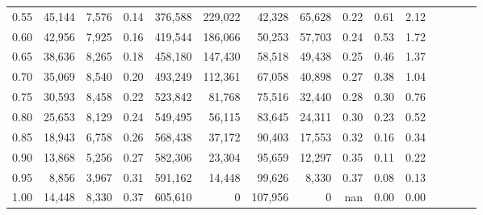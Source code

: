 \begin{tabular}{rrrcrrrrrrrrrrr}
0.55 &  45,144 &  7,576 &                                       0.14 &  376,588 &  229,022 &   42,328 &   65,628 &  0.22 &  0.61 &                         2.12 \\
0.60 &  42,956 &  7,925 &                                       0.16 &  419,544 &  186,066 &   50,253 &   57,703 &  0.24 &  0.53 &                         1.72 \\
0.65 &  38,636 &  8,265 &                                       0.18 &  458,180 &  147,430 &   58,518 &   49,438 &  0.25 &  0.46 &                         1.37 \\
0.70 &  35,069 &  8,540 &                                       0.20 &  493,249 &  112,361 &   67,058 &   40,898 &  0.27 &  0.38 &                         1.04 \\
0.75 &  30,593 &  8,458 &                                       0.22 &  523,842 &   81,768 &   75,516 &   32,440 &  0.28 &  0.30 &                         0.76 \\
0.80 &  25,653 &  8,129 &                                       0.24 &  549,495 &   56,115 &   83,645 &   24,311 &  0.30 &  0.23 &                         0.52 \\
0.85 &  18,943 &  6,758 &                                       0.26 &  568,438 &   37,172 &   90,403 &   17,553 &  0.32 &  0.16 &                         0.34 \\
0.90 &  13,868 &  5,256 &                                       0.27 &  582,306 &   23,304 &   95,659 &   12,297 &  0.35 &  0.11 &                         0.22 \\
0.95 &   8,856 &  3,967 &                                       0.31 &  591,162 &   14,448 &   99,626 &    8,330 &  0.37 &  0.08 &                         0.13 \\
1.00 &  14,448 &  8,330 &                                       0.37 &  605,610 &        0 &  107,956 &        0 &   nan &  0.00 &                         0.00 \\
\bottomrule
\end{tabular}
